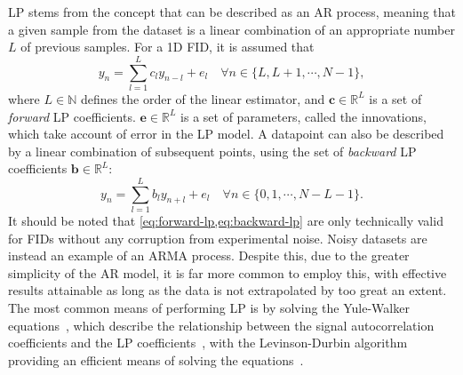 \ac{LP} stems from the concept that  can be described as
an \ac{AR} process, meaning that a given sample from the dataset is a linear
combination of an appropriate number $L$ of previous samples. For a \ac{1D}
\ac{FID}, it is assumed that
\begin{equation}
    y_n = \sum_{l=1}^{L}
    c_l y_{n-l} + e_l \quad
    \forall n \in \lbrace L, L + 1, \cdots, N - 1 \rbrace,
    \label{eq:forward-lp}
\end{equation}
where $L \in
\mathbb{N}$ defines the order of the linear estimator, and $\symbf{c} \in
\mathbb{R}^{L}$ is a set of \emph{forward} \ac{LP} coefficients. $\symbf{e} \in
\mathbb{R}^L$ is a set of parameters, called the innovations,
which take account of error in the \ac{LP} model. A datapoint can also be
described by a linear combination of subsequent points, using the set of
\emph{backward}
\ac{LP} coefficients $\symbf{b} \in \mathbb{R}^L$:
\begin{equation}
    y_n = \sum_{l=1}^{L}
    b_l y_{n+l} + e_l \quad
    \forall n \in \lbrace 0, 1, \cdots, N - L - 1 \rbrace.
    \label{eq:backward-lp}
\end{equation}
 It should be noted that \cref{eq:forward-lp,eq:backward-lp} are only technically valid for
\acp{FID} without any corruption from experimental noise. Noisy datasets are
instead an example of an \ac{ARMA} process. Despite this, due to the greater
simplicity of the \ac{AR} model, it is far more common to employ this, with
effective results attainable as long as the data is not extrapolated by too
great an extent. The most common means of performing \ac{LP} is by solving the
Yule-Walker equations~\cite{Yule1927,Walker1931}, which describe the
relationship between the signal autocorrelation coefficients and the \ac{LP}
coefficients~\cite[Section 3.3]{Koehl1999}, with the Levinson-Durbin algorithm
providing an efficient means of solving the
equations~\cite{Levinson1946,Durbin1960}.

